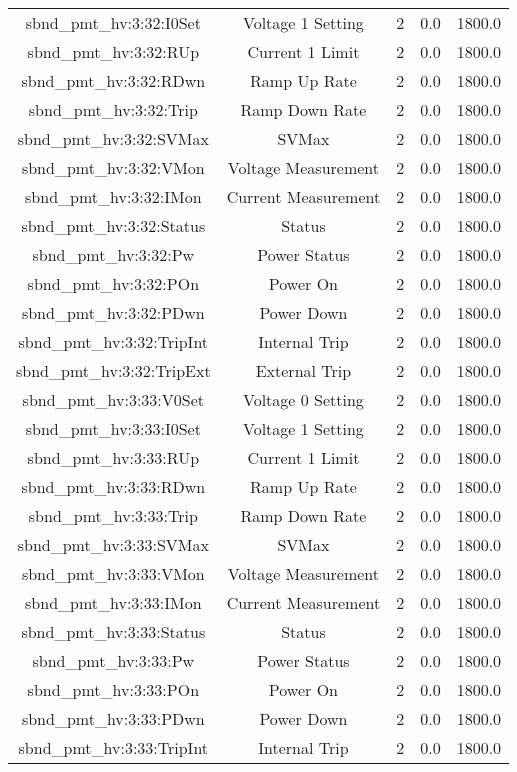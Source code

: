 \begin{table}[ptb]
\begin{tabular}{c | c c c c}
sbnd_pmt_hv:3:32:I0Set & Voltage 1 Setting & 2 & 0.0 & 1800.0\\ 
sbnd_pmt_hv:3:32:RUp & Current 1 Limit & 2 & 0.0 & 1800.0\\ 
sbnd_pmt_hv:3:32:RDwn & Ramp Up Rate & 2 & 0.0 & 1800.0\\ 
sbnd_pmt_hv:3:32:Trip & Ramp Down Rate & 2 & 0.0 & 1800.0\\ 
sbnd_pmt_hv:3:32:SVMax & SVMax & 2 & 0.0 & 1800.0\\ 
sbnd_pmt_hv:3:32:VMon & Voltage Measurement & 2 & 0.0 & 1800.0\\ 
sbnd_pmt_hv:3:32:IMon & Current Measurement & 2 & 0.0 & 1800.0\\ 
sbnd_pmt_hv:3:32:Status & Status & 2 & 0.0 & 1800.0\\ 
sbnd_pmt_hv:3:32:Pw & Power Status & 2 & 0.0 & 1800.0\\ 
sbnd_pmt_hv:3:32:POn & Power On & 2 & 0.0 & 1800.0\\ 
sbnd_pmt_hv:3:32:PDwn & Power Down & 2 & 0.0 & 1800.0\\ 
sbnd_pmt_hv:3:32:TripInt & Internal Trip & 2 & 0.0 & 1800.0\\ 
sbnd_pmt_hv:3:32:TripExt & External Trip & 2 & 0.0 & 1800.0\\ 
sbnd_pmt_hv:3:33:V0Set & Voltage 0 Setting & 2 & 0.0 & 1800.0\\ 
sbnd_pmt_hv:3:33:I0Set & Voltage 1 Setting & 2 & 0.0 & 1800.0\\ 
sbnd_pmt_hv:3:33:RUp & Current 1 Limit & 2 & 0.0 & 1800.0\\ 
sbnd_pmt_hv:3:33:RDwn & Ramp Up Rate & 2 & 0.0 & 1800.0\\ 
sbnd_pmt_hv:3:33:Trip & Ramp Down Rate & 2 & 0.0 & 1800.0\\ 
sbnd_pmt_hv:3:33:SVMax & SVMax & 2 & 0.0 & 1800.0\\ 
sbnd_pmt_hv:3:33:VMon & Voltage Measurement & 2 & 0.0 & 1800.0\\ 
sbnd_pmt_hv:3:33:IMon & Current Measurement & 2 & 0.0 & 1800.0\\ 
sbnd_pmt_hv:3:33:Status & Status & 2 & 0.0 & 1800.0\\ 
sbnd_pmt_hv:3:33:Pw & Power Status & 2 & 0.0 & 1800.0\\ 
sbnd_pmt_hv:3:33:POn & Power On & 2 & 0.0 & 1800.0\\ 
sbnd_pmt_hv:3:33:PDwn & Power Down & 2 & 0.0 & 1800.0\\ 
sbnd_pmt_hv:3:33:TripInt & Internal Trip & 2 & 0.0 & 1800.0\\ 

\end{tabular}
\end{table}
